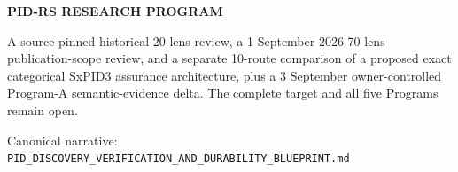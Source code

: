 {\begin{titlepage}
    \vspace*{0.8cm}
    {\sffamily\Large\bfseries\color{PidSaffron}PID-RS RESEARCH PROGRAM\par}
    \vspace{1.8cm}
    {\fontsize{34}{40}\selectfont\bfseries\color{white}\@title\par}
    \vspace{5.2cm}
    \vfill
    \begin{minipage}{0.86\textwidth}
      \large\color{PidInk}
      A source-pinned historical 20-lens review, a 1 September 2026 70-lens publication-scope
      review, and a separate 10-route comparison of a proposed exact categorical SxPID3 assurance
      architecture, plus a 3 September owner-controlled Program-A semantic-evidence delta. The
      complete target and all five Programs remain open.
    \end{minipage}\par
    \vspace{1.4cm}
    {\sffamily\large\bfseries\color{PidBlue}\@author\par}
    \vspace{3mm}
    {\sffamily\large\bfseries\color{PidBlue}\@date\par}
    \vspace{.6cm}
    {\sffamily\small\color{PidInk}Canonical narrative: \texttt{PID\_DISCOVERY\_VERIFICATION\_AND\_DURABILITY\_BLUEPRINT.md}\par}
  \end{titlepage}
  \nopagecolor\color{black}
}
\makeatother

